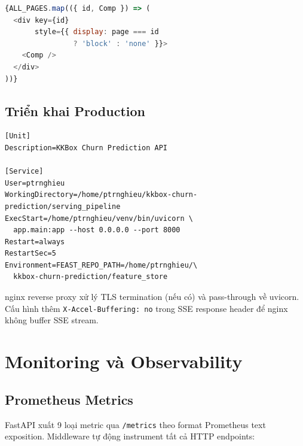 \documentclass[conference]{IEEEtran}
\begin{document}
\begin{lstlisting}[language=JavaScript, caption={All pages mounted simultaneously}]
{ALL_PAGES.map(({ id, Comp }) => (
  <div key={id}
       style={{ display: page === id
                ? 'block' : 'none' }}>
    <Comp />
  </div>
))}
\end{lstlisting}

\subsection{Triển khai Production}

\begin{lstlisting}[caption={systemd service configuration}]
[Unit]
Description=KKBox Churn Prediction API

[Service]
User=ptrnghieu
WorkingDirectory=/home/ptrnghieu/kkbox-churn-prediction/serving_pipeline
ExecStart=/home/ptrnghieu/venv/bin/uvicorn \
  app.main:app --host 0.0.0.0 --port 8000
Restart=always
RestartSec=5
Environment=FEAST_REPO_PATH=/home/ptrnghieu/\
  kkbox-churn-prediction/feature_store
\end{lstlisting}

nginx reverse proxy xử lý TLS termination (nếu có) và pass-through về
uvicorn. Cấu hình thêm \texttt{X-Accel-Buffering: no} trong SSE response
header để nginx không buffer SSE stream.

\section{Monitoring và Observability}
\label{sec:monitoring}

\subsection{Prometheus Metrics}

FastAPI xuất 9 loại metric qua \texttt{/metrics} theo format Prometheus
text exposition. Middleware tự động instrument tất cả HTTP endpoints:
\end{document}
